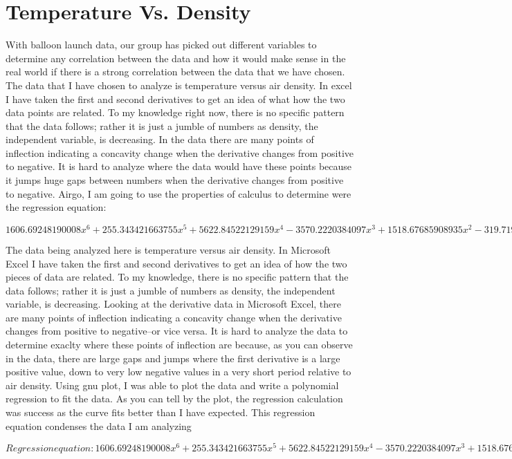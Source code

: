 \documentclass{article}
\begin{document}
\part{Temperature Vs. Density}

With balloon launch data, our group has picked out different variables to determine any correlation between the data and how it would make sense in the real world if there is a strong correlation between the data that we have chosen.
The data that I have chosen to analyze is temperature versus air density. In excel I have taken the first and second derivatives to get an idea of what how the two data points are related. To my knowledge right now, there is no specific pattern that the data follows; rather it is just a jumble of numbers as density, the independent variable, is decreasing.
In the data there are many points of inflection indicating a concavity change when the derivative changes from positive to negative. It is hard to analyze where the data would have these points because it jumps huge gaps between numbers when the derivative changes from positive to negative. Airgo, I am going to use the properties of calculus to determine were the regression equation:

$$ 1606.69248190008x^6 + 255.343421663755x^5 + 5622.84522129159x^4 -3570.2220384097x^3 + 1518.67685908935x^2 -319.719301948874x +235.092280725325 $$

The data being analyzed here is temperature versus air density. In Microsoft Excel I have taken the first and second derivatives to get an idea of how the two pieces of data are related. To my knowledge, there is no specific pattern that the data follows; rather it is just a jumble of numbers as density, the independent variable, is decreasing.
Looking at the derivative data in Microsoft Excel, there are many points of inflection indicating a concavity change when the derivative changes from positive to negative--or vice versa. It is hard to analyze the data to determine exaclty where these points of inflection are because, as you can observe in the data, there are large gaps and jumps where the first derivative is a large positive value, down to very low negative values in a very short period relative to air density. Using gnu plot, I was able to plot the data and write a polynomial regression to fit the data. As you can tell by the plot, the regression calculation was success as the curve fits better than I have expected. This regression equation condenses the data I am analyzing

$$ Regression equation: 1606.69248190008x^6 + 255.343421663755x^5 + 5622.84522129159x^4 -3570.2220384097x^3 + 1518.67685908935x^2 -319.719301948874x +235.092280725325$$
\end{document}
